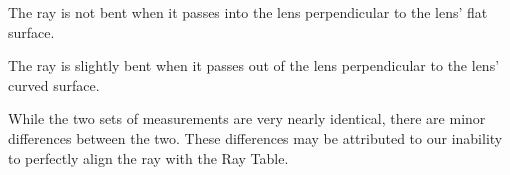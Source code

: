 \documentclass[12pt]{article}
\begin{document}
\subsubsubsection{}

The ray is not bent when it passes into the lens perpendicular to the lens' flat
surface.

\subsubsubsection{}

The ray is slightly bent when it passes out of the lens perpendicular to the
lens' curved surface.

\subsubsubsection{}

While the two sets of measurements are very nearly identical, there are minor
differences between the two. These differences may be attributed to our
inability to perfectly align the ray with the Ray Table.





































\end{document}
